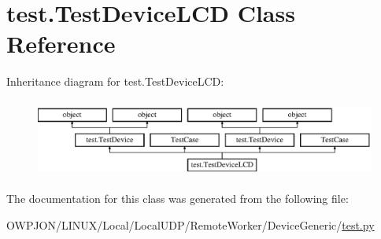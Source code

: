 \hypertarget{classtest_1_1TestDeviceLCD}{\section{test.\-Test\-Device\-L\-C\-D Class Reference}
\label{classtest_1_1TestDeviceLCD}
}
Inheritance diagram for test.\-Test\-Device\-L\-C\-D\-:\begin{figure}[H]
\begin{center}
\leavevmode
\includegraphics[height=2.564885cm]{classtest_1_1TestDeviceLCD}
\end{center}
\end{figure}


The documentation for this class was generated from the following file\-:\begin{DoxyCompactItemize}
\item 
O\-W\-P\-J\-O\-N/\-L\-I\-N\-U\-X/\-Local/\-Local\-U\-D\-P/\-Remote\-Worker/\-Device\-Generic/\hyperlink{LINUX_2Local_2LocalUDP_2RemoteWorker_2DeviceGeneric_2test_8py}{test.\-py}\end{DoxyCompactItemize}
